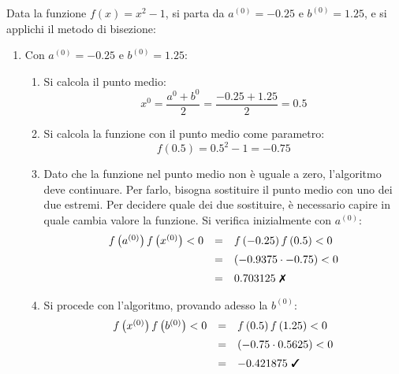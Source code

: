 \documentclass[a4paper]{article}
\begin{document}
    \begin{examplebox}
        Data la funzione $f\left(x\right) = x^{2} - 1$, si parta da $a^(0) = -0.25$ e $b^{(0)} = 1.25$, e si applichi il metodo di bisezione:
        \begin{enumerate}
            \item Con $a^{(0)} = -0.25$ e $b^{(0)} = 1.25$:
            \begin{enumerate}
                \item Si calcola il punto medio:
                \begin{equation*}
                    x^{0} = \dfrac{a^{0} + b^{0}}{2} = \dfrac{-0.25 + 1.25}{2} = 0.5
                \end{equation*}

                \item Si calcola la funzione con il punto medio come parametro:
                \begin{equation*}
                    f\left(0.5\right) = 0.5^{2} - 1 = -0.75
                \end{equation*}

                \item Dato che la funzione nel punto medio non è uguale a zero, l'algoritmo deve continuare. Per farlo, bisogna sostituire il punto medio con uno dei due estremi. Per decidere quale dei due sostituire, è necessario capire in quale cambia valore la funzione. Si verifica inizialmente con $a^{(0)}$:
                \begin{equation*}
                    \begin{array}{rcl}
                        f\left(a^{(0)}\right)f\left(x^{(0)}\right) < 0 &=& f\left(-0.25\right)f\left(0.5\right) < 0 \\ [.5em]
                        &=& \left(-0.9375 \cdot -0.75\right) < 0 \\ [.5em]
                        &=& 0.703125 \text{ \ding{55}}
                    \end{array}
                \end{equation*}
                
                \item Si procede con l'algoritmo, provando adesso la $b^{(0)}$:
                \begin{equation*}
                    \begin{array}{rcl}
                        f\left(x^{(0)}\right)f\left(b^{(0)}\right) < 0 &=& f\left(0.5\right)f\left(1.25\right) < 0 \\ [.5em]
                        &=& \left(-0.75 \cdot 0.5625\right) < 0 \\ [.5em]
                        &=& -0.421875 \text{ \ding{51}}
                    \end{array}
                \end{equation*}


\end{enumerate}
\end{enumerate}
\end{examplebox}
\end{document}
